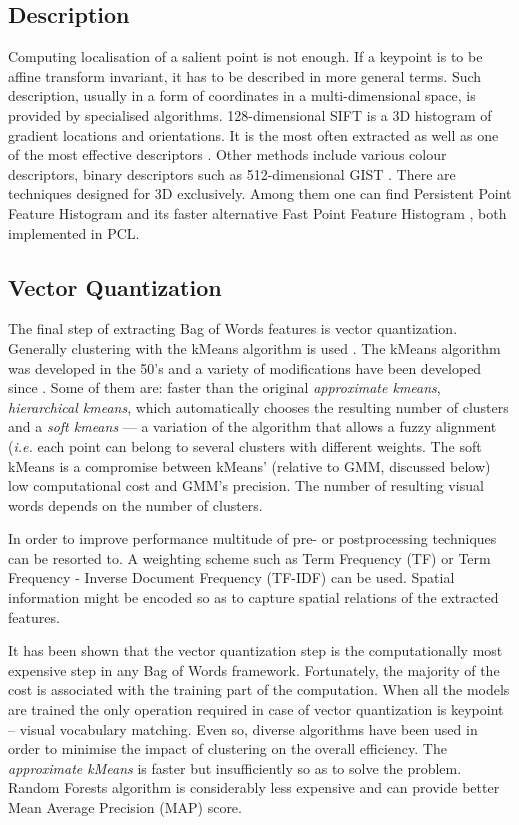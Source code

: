 	
	
\subsection{Description}

	Computing localisation of a salient point is not enough. If a keypoint is to be affine transform invariant, it has to be described in more general terms. Such description, usually in a form of coordinates in a multi-dimensional space, is provided by specialised algorithms. 128-dimensional SIFT \cite{sift_features} is a 3D histogram of gradient locations and orientations. It is the most often extracted as well as one of the most effective descriptors \cite{tsai2012bag}. Other methods include various colour descriptors, binary descriptors such as 512-dimensional GIST \cite{ponce2011cv}. There are techniques designed for 3D exclusively. Among them one can find Persistent Point Feature Histogram \cite{pfh_rusu2008} and its faster alternative Fast Point Feature Histogram \cite{fpfh_rusu2009}, both implemented in PCL.

\subsection{Vector Quantization}

	The final step of extracting Bag of Words features is vector quantization. Generally clustering with the kMeans algorithm is used \cite{tsai2012bag}. The kMeans algorithm was developed in the 50's and a variety of modifications have been developed since \cite{kmeans_jain2010data}. Some of them are: faster than the original \emph{approximate kmeans}, \emph{hierarchical kmeans}, which automatically chooses the resulting number of clusters and a  \emph{soft kmeans} --- a variation of the algorithm that allows a fuzzy alignment (\textit{i.e.} each point can belong to several clusters with different weights. The soft kMeans is a compromise between kMeans' (relative to GMM, discussed below) low computational cost and GMM's precision. The number of resulting visual words depends on the number of clusters.
	
	In order to improve performance multitude of pre- or postprocessing techniques can be resorted to. A weighting scheme such as Term Frequency (TF) or Term Frequency - Inverse Document Frequency (TF-IDF) can be used. Spatial information might be encoded so as to capture spatial relations of the extracted features.
	
	It has been shown that the vector quantization step is the computationally most expensive step in any Bag of Words framework. Fortunately, the majority of the cost is associated with the training part of the computation. When all the models are trained the only operation required in case of vector quantization is keypoint -- visual vocabulary matching. Even so, diverse algorithms have been used in order to minimise the impact of clustering on the overall efficiency. The \emph{approximate kMeans} is faster but insufficiently so as to solve the problem. Random Forests algorithm is considerably less expensive and can provide better Mean Average Precision (MAP) score.
	
